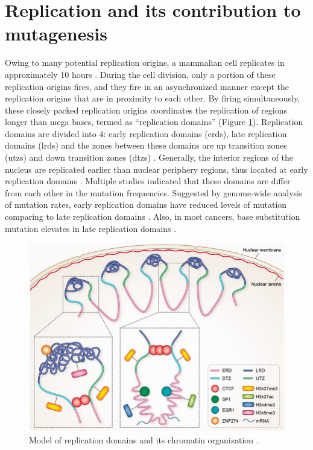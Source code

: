 \section{Replication and its contribution to mutagenesis}

Owing to many potential replication origins, a mammalian cell replicates in approximately 10 hours \citep{takebayashi2017anatomy}. During the cell division, only a portion of these replication origins fires, and they fire in an asynchronized manner except the replication origins that are in proximity to each other. By firing simultaneously, these closely packed replication origins coordinates the replication of regions longer than mega bases, termed as “replication domains” \citep{jackson1998replicon} (Figure \ref{fig:introrepdomains}). Replication domains are divided into 4: early replication domains (\gls{erd}s), late replication domains (\gls{lrd}s) and the zones between these domains are up transition zones (\gls{utz}s) and down transition zones (\gls{dtz}s) \citep{farkash2008global,hansen2010sequencing,hiratani2008global,koren2014genetic,nakayasu1989mapping,o1992dynamic}. Generally, the interior regions of the nucleus are replicated earlier than nuclear periphery regions, thus located at early replication domains \citep{dimitrova2002spatio}. Multiple studies indicated that these domains are differ from each other in the mutation frequencies. Suggested by genome-wide analysis of mutation rates, early replication domains have reduced levels of mutation comparing to late replication domains \citep{lawrence2013mutational,stamatoyannopoulos2009human}. Also, in most cancers, base substitution mutation elevates in late replication domains \citep{schuster2012chromatin}.

\shorthandoff{=}
\begin{figure}[H]
    \begin{center}
    \includegraphics[width=\textwidth]{Chapters/1_introduction/figures/repdomains}
    \caption{Model of replication domains and its chromatin organization \citep{liu2016novo}.}
    \label{fig:introrepdomains}
    \end{center}
    \end{figure}

